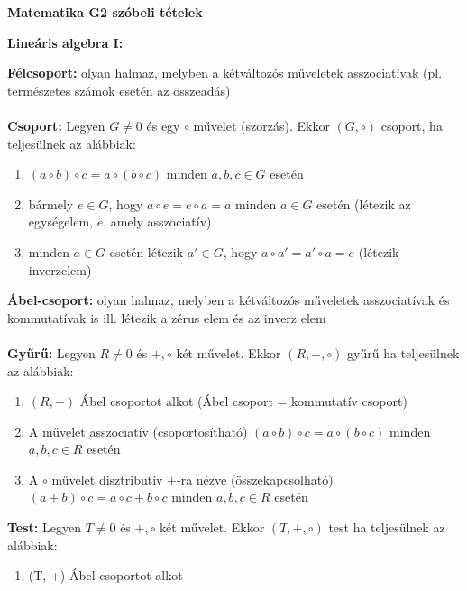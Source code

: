 \documentclass[11pt,a4paper]{article}
\begin{document}
\newpage
\begin{center}
    \textbf{Matematika G2 szóbeli tételek}
\end{center}
\textbf{Lineáris algebra I:}
\begin{tcolorbox}[colback=blue!5!white,colframe=blue!70!black,title= 1. Csoport{,} gyűrű{,} test]
    \textbf{Félcsoport:} olyan halmaz, melyben a kétváltozós műveletek asszociatívak (pl. természetes számok esetén az összeadás)\\\\
        \textbf{Csoport:} Legyen \(G\neq 0\) és egy \(\circ \) művelet (szorzás). Ekkor \((G, \circ )\) csoport, ha teljesülnek az alábbiak:
        \begin{enumerate}
            \item \((a \circ b) \circ c = a \circ (b \circ c)\) minden \(a, b, c \in G\) esetén
            \item bármely \(e \in G\), hogy \(a \circ e = e \circ a = a\) minden \(a \in G\) esetén (létezik az egységelem, \(e\), amely asszociatív)
            \item minden \(a \in G\) esetén létezik \(a' \in G\), hogy \(a \circ a'=a' \circ a = e\) (létezik inverzelem)
        \end{enumerate}
        \textbf{Ábel-csoport:} olyan halmaz, melyben a kétváltozós műveletek asszociatívak és kommutatívak is ill. létezik a zérus elem és az inverz elem\\\\
        \textbf{Gyűrű:}
        Legyen \(R\neq 0\) és \(+, \circ \) két művelet. Ekkor \((R, +, \circ )\) gyűrű ha teljesülnek az alábbiak:
        \begin{enumerate}
            \item \((R, +)\) Ábel csoportot alkot (Ábel csoport = kommutatív csoport)
            \item A  művelet asszociatív (csoportosítható) \((a \circ b) \circ c = a \circ (b \circ c)\) minden \(a, b, c \in R\) esetén
            \item A \(\circ \) művelet disztributív \(+\)-ra nézve (összekapcsolható) \((a + b) \circ c = a \circ c + b \circ c\) minden \(a, b, c \in R\) esetén
        \end{enumerate}
        \textbf{Test:} 
        Legyen \(T \neq 0\) és \(+, \circ \) két művelet. Ekkor \((T, +, \circ)\) test ha teljesülnek az alábbiak:
        \begin{enumerate}
            \item (T, +) Ábel csoportot alkot

\end{enumerate}
\end{tcolorbox}
\end{document}
